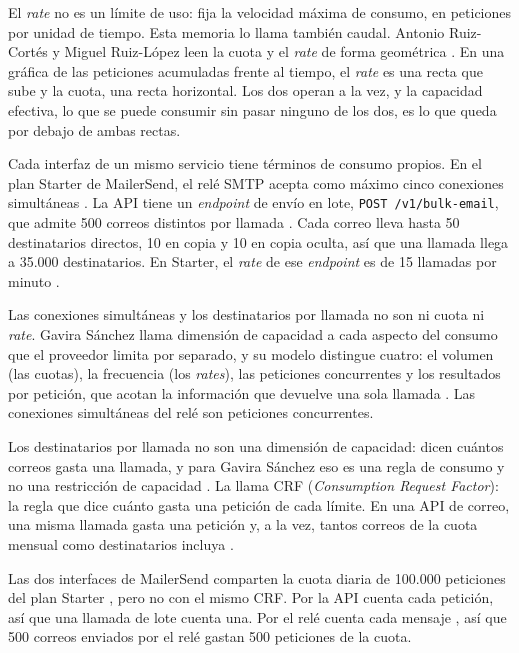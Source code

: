 El \textit{rate} no es un límite de uso: fija la velocidad máxima de consumo,
en peticiones por unidad de tiempo. Esta memoria lo llama también caudal.
Antonio Ruiz-Cortés y Miguel Ruiz-López leen la cuota y el \textit{rate} de
forma geométrica \citep{ruizcortes2025cajanegra}. En una gráfica de las
peticiones acumuladas frente al tiempo, el \textit{rate} es una recta que sube
y la cuota, una recta horizontal. Los dos operan a la vez, y la capacidad
efectiva, lo que se puede consumir sin pasar ninguno de los dos, es lo que
queda por debajo de ambas rectas.

Cada interfaz de un mismo servicio tiene términos de consumo propios. En el
plan Starter de MailerSend, el relé SMTP acepta como máximo
cinco conexiones simultáneas \citep{mailersendsmtp}. La API tiene un
\textit{endpoint} de envío en lote, \texttt{POST /v1/bulk-email}, que admite
500 correos distintos por llamada \citep{mailersendbulk}. Cada correo lleva
hasta 50 destinatarios directos, 10 en copia y 10 en copia oculta, así que una
llamada llega a 35.000 destinatarios. En Starter, el \textit{rate} de ese
\textit{endpoint} es de 15 llamadas por minuto \citep{mailersendemailapi}.

Las conexiones simultáneas y los destinatarios por llamada no son ni cuota ni
\textit{rate}. Gavira Sánchez llama dimensión de capacidad a cada aspecto del
consumo que el proveedor limita por separado, y su modelo distingue cuatro: el
volumen (las cuotas), la frecuencia (los \textit{rates}), las peticiones
concurrentes y los resultados por petición, que acotan la información que
devuelve una sola llamada \citep{gavira2026tfm}. Las conexiones simultáneas
del relé son peticiones concurrentes.

Los destinatarios por llamada no son una dimensión de capacidad: dicen cuántos
correos gasta una llamada, y para Gavira Sánchez eso es una regla de consumo y
no una restricción de capacidad \citep{gavira2026tfm}. La llama CRF
(\textit{Consumption Request Factor}): la regla que dice cuánto gasta una
petición de cada límite. En una API de correo, una misma
llamada gasta una petición y, a la vez, tantos correos de la cuota mensual
como destinatarios incluya \citep{gavira2026tfm}.

Las dos interfaces de MailerSend comparten la cuota diaria de 100.000
peticiones del plan Starter \citep{mailersenddocs}, pero no con el mismo CRF.
Por la API cuenta cada petición, así que una llamada de lote cuenta una. Por el
relé cuenta cada mensaje \citep{mailersendsmtpdocs}, así que 500 correos
enviados por el relé gastan 500 peticiones de la cuota.

